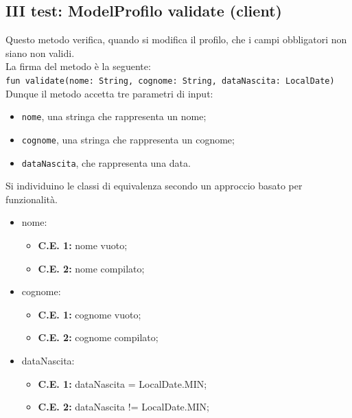         \subsection{III test: ModelProfilo validate (client)}
            Questo metodo verifica, quando si modifica il profilo, che i campi obbligatori non siano non validi. \\

            \noindent La firma del metodo è la seguente:\\
            \texttt{fun validate(nome: String, cognome: String, dataNascita: LocalDate)} \\

            \noindent Dunque il metodo accetta tre parametri di input:
            \begin{itemize}
                \item\texttt{nome}, una stringa che rappresenta un nome;
                \item\texttt{cognome}, una stringa che rappresenta un cognome;
                \item\texttt{dataNascita}, che rappresenta una data. \\
            \end{itemize}

            \noindent Si individuino le classi di equivalenza secondo un approccio basato per funzionalità.

            \begin{itemize}
                \item nome:
                    \begin{itemize}
                        \item\textbf{C.E. 1:} nome vuoto;
                        \item\textbf{C.E. 2:} nome compilato;
                    \end{itemize}
                \item cognome:
                    \begin{itemize}
                        \item\textbf{C.E. 1:} cognome vuoto;
                        \item\textbf{C.E. 2:} cognome compilato;
                    \end{itemize}
                \item dataNascita:
                    \begin{itemize}
                        \item\textbf{C.E. 1:} dataNascita = LocalDate.MIN;
                        \item\textbf{C.E. 2:} dataNascita != LocalDate.MIN; 
                    \end{itemize}
            \end{itemize}


